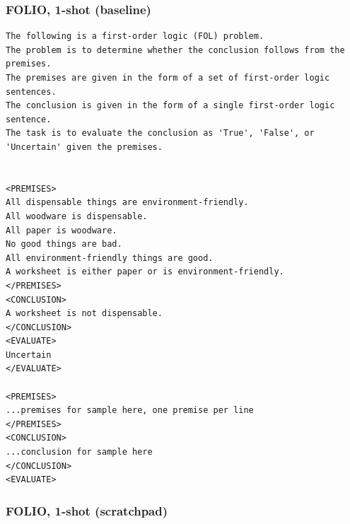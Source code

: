 \subsubsection{FOLIO, 1-shot (baseline)}
\begin{lstlisting}[caption={todo},captionpos=b, breaklines=true]
The following is a first-order logic (FOL) problem.
The problem is to determine whether the conclusion follows from the premises.
The premises are given in the form of a set of first-order logic sentences.
The conclusion is given in the form of a single first-order logic sentence.
The task is to evaluate the conclusion as 'True', 'False', or 'Uncertain' given the premises.


<PREMISES>
All dispensable things are environment-friendly.
All woodware is dispensable.
All paper is woodware.
No good things are bad.
All environment-friendly things are good.
A worksheet is either paper or is environment-friendly.
</PREMISES>
<CONCLUSION>
A worksheet is not dispensable.
</CONCLUSION>
<EVALUATE>
Uncertain
</EVALUATE>

<PREMISES>
...premises for sample here, one premise per line
</PREMISES>
<CONCLUSION>
...conclusion for sample here
</CONCLUSION>
<EVALUATE>
\end{lstlisting}

\subsubsection{FOLIO, 1-shot (scratchpad)}

